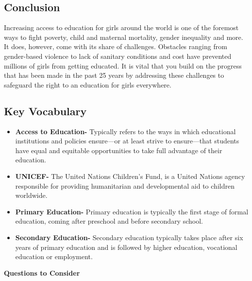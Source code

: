\documentclass[10pt, letterpaper]{article}
\begin{document}
\subsection{Conclusion}

Increasing access to education for girls around the world is one of the
foremost ways to fight poverty, child and maternal mortality, gender
inequality and more. It does, however, come with its share of
challenges. Obstacles ranging from gender-based violence to lack of
sanitary conditions and cost have prevented millions of girls from
getting educated. It is vital that you build on the progress that has
been made in the past 25 years by addressing these challenges to
safeguard the right to an education for girls everywhere. \\

\subsection{Key Vocabulary}

\begin{itemize}
\item  
\textbf{Access to Education-} Typically refers to the ways in which educational
institutions and policies ensure---or at least strive to ensure---that
students have equal and equitable opportunities to take full advantage
of their education.
\item 
\textbf{UNICEF-} The United Nations Children's Fund, is a United Nations agency
responsible for providing humanitarian and developmental aid to children
worldwide.
\item 
\textbf{Primary Education-} Primary education is typically the first stage of
formal education, coming after preschool and before secondary school.
\item 
\textbf{Secondary Education-} Secondary education typically takes place after six
years of primary education and is followed by higher education,
vocational education or employment.
\end{itemize}

\textbf{Questions to Consider}
\end{document}
